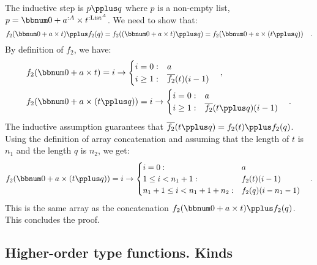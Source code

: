 The inductive step is $p\pplus q$ where $p$ is a non-empty list,
$p=\bbnum 0+a^{:A}\times t^{:\text{List}^{A}}$. We need to show that:
\[
f_{2}(\bbnum 0+a\times t)\pplus f_{2}(q)=f_{2}((\bbnum 0+a\times t)\pplus q)=f_{2}(\bbnum 0+a\times(t\pplus q))\quad.
\]
By definition of $f_{2}$, we have:
\begin{align*}
 & f_{2}(\bbnum 0+a\times t)=i\rightarrow\begin{cases}
i=0: & a\\
i\geq1: & \overline{f_{2}}(t)(i-1)
\end{cases}\quad,\\
 & f_{2}(\bbnum 0+a\times(t\pplus q))=i\rightarrow\begin{cases}
i=0: & a\\
i\geq1: & \overline{f_{2}}(t\pplus q)(i-1)
\end{cases}\quad.
\end{align*}
The inductive assumption guarantees that $\overline{f_{2}}(t\pplus q)=f_{2}(t)\pplus f_{2}(q)$.
Using the definition of array concatenation and assuming that the
length of $t$ is $n_{1}$ and the length $q$ is $n_{2}$, we get:
\[
f_{2}(\bbnum 0+a\times(t\pplus q))=i\rightarrow\begin{cases}
i=0: & a\\
1\leq i<n_{1}+1: & f_{2}(t)(i-1)\\
n_{1}+1\leq i<n_{1}+1+n_{2}: & f_{2}(q)(i-n_{1}-1)
\end{cases}\quad.
\]
This is the same array as the concatenation $f_{2}(\bbnum 0+a\times t)\pplus f_{2}(q)$.
This concludes the proof.

\subsection{Higher-order type functions. Kinds}

